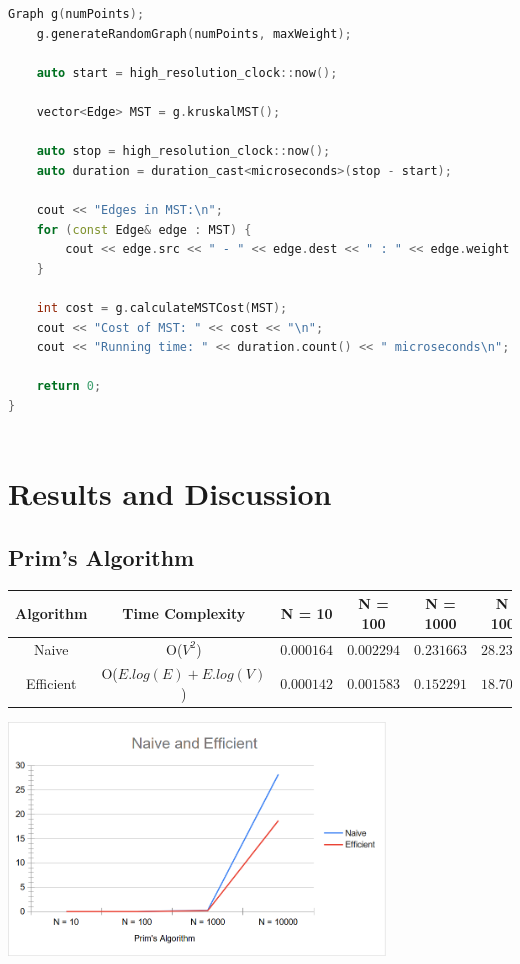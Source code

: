 \documentclass[a4paper, 10pt, twocolumn]{article}
\begin{document}
\begin{lstlisting}[language=C++, caption={C++ code for Efficient Kruskal's Algorithm using Merge Sort}]
    Graph g(numPoints);
    g.generateRandomGraph(numPoints, maxWeight);

    auto start = high_resolution_clock::now();

    vector<Edge> MST = g.kruskalMST();

    auto stop = high_resolution_clock::now();
    auto duration = duration_cast<microseconds>(stop - start);

    cout << "Edges in MST:\n";
    for (const Edge& edge : MST) {
        cout << edge.src << " - " << edge.dest << " : " << edge.weight << "\n";
    }

    int cost = g.calculateMSTCost(MST);
    cout << "Cost of MST: " << cost << "\n";
    cout << "Running time: " << duration.count() << " microseconds\n";

    return 0;
}
    
\end{lstlisting}
\newpage
\section{Results and Discussion}
\subsection{Prim's Algorithm}
\begin{center}
  \centering
  \begin{tabular}{|c|c|c|c|c|c|}
    \hline
    \textbf {Algorithm} & \textbf {Time Complexity} & \textbf {N = 10} & \textbf {N = 100} & \textbf {N = 1000} & \textbf {N = 10000}\\
    \hline %
    Naive & O($V^2$) & $0.000164$ & $0.002294$ & $0.231663$ & $28.232615$\\
    \hline %
    Efficient & O($E.log(E)+E.log(V)$) & $0.000142$ & $0.001583 $ & $0.152291 $ & $18.707917$  \\
    \hline
  \end{tabular}
      \includegraphics[width=0.75\textwidth]{Prim.png}\par\vspace{1cm}
\end{center}
\begin{center}
  \centering
\end{center}
\end{document}
